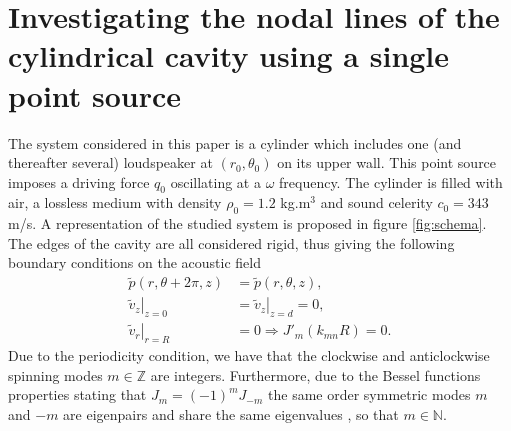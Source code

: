\documentclass[%
 reprint,
 amsmath,amssymb,
 aip,
]{revtex4-1}
\begin{document}
\section{Investigating the nodal lines of the cylindrical cavity using a single point source}

The system considered in this paper is a cylinder which includes one (and thereafter several) loudspeaker at $(r_0, \theta_0)$ on its upper wall. This point source imposes a driving force $q_0$ oscillating at a $\omega$ frequency. The cylinder is filled with air, a lossless medium with density $\rho_0 = 1.2$ kg.m$^3$ and sound celerity $c_0 = 343$ m/s. A representation of the studied system is proposed in figure \ref{fig:schema}. The edges of the cavity are all considered rigid, thus giving the following boundary conditions on the acoustic field
\begin{equation}
   \begin{split}
       \tilde{p}(r, \theta + 2 \pi , z) &= \tilde{p}(r, \theta, z),\\
       \left. \tilde{v}_z \right|_{z=0} & = \left. \tilde{v}_z \right|_{z=d} = 0,\\
               \left. \tilde{v}_r \right|_{r=R} & = 0 \Rightarrow J'_m (k_{mn}R) = 0.
   \end{split} 
\end{equation}
Due to the periodicity condition, we have that the clockwise and anticlockwise spinning modes $m \in \mathbb{Z}$ are integers. Furthermore, due to the Bessel functions properties stating that $J_m = (-1)^m J_{-m}$ the same order symmetric modes $m$ and $-m$ are eigenpairs and share the same eigenvalues \cite{rona2007}, so that $m \in \mathbb{N}$.
\end{document}
